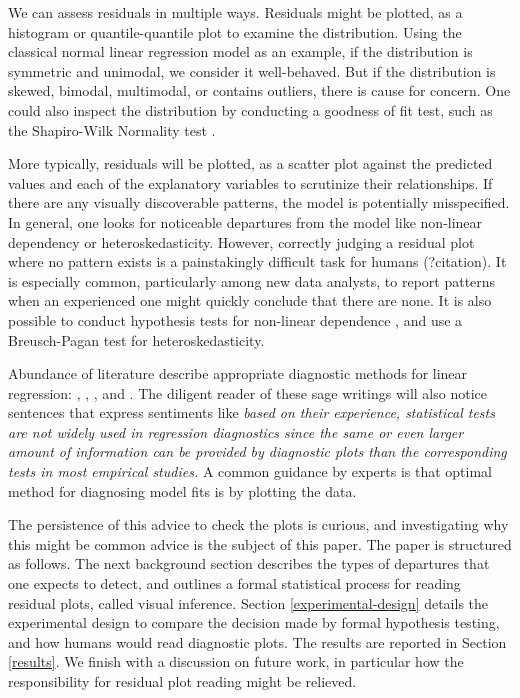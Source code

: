 \documentclass[]{interact}
\theoremstyle{plain}%
\theoremstyle{definition}
\theoremstyle{remark}
\begin{document}
We can assess residuals in multiple ways. Residuals might be plotted, as
a histogram or quantile-quantile plot to examine the distribution. Using
the classical normal linear regression model as an example, if the
distribution is symmetric and unimodal, we consider it well-behaved. But
if the distribution is skewed, bimodal, multimodal, or contains
outliers, there is cause for concern. One could also inspect the
distribution by conducting a goodness of fit test, such as the
Shapiro-Wilk Normality test \citep{shapiro1965analysis}.

More typically, residuals will be plotted, as a scatter plot against the
predicted values and each of the explanatory variables to scrutinize
their relationships. If there are any visually discoverable patterns,
the model is potentially misspecified. In general, one looks for
noticeable departures from the model like non-linear dependency or
heteroskedasticity. However, correctly judging a residual plot where no
pattern exists is a painstakingly difficult task for humans (?citation).
It is especially common, particularly among new data analysts, to report
patterns when an experienced one might quickly conclude that there are
none. It is also possible to conduct hypothesis tests for non-linear
dependence \citep{ramsey_tests_1969}, and use a Breusch-Pagan test
\citep{breusch_simple_1979} for heteroskedasticity.

Abundance of literature describe appropriate diagnostic methods for
linear regression: \citet{draper1998applied},
\citet{montgomery1982introduction}, \citet{belsley_regression_1980},
\citet{cook_applied_1999} and \citet{cook1982residuals}. The diligent
reader of these sage writings will also notice sentences that express
sentiments like \emph{based on their experience, statistical tests are
not widely used in regression diagnostics since the same or even larger
amount of information can be provided by diagnostic plots than the
corresponding tests in most empirical studies.} A common guidance by
experts is that optimal method for diagnosing model fits is by plotting
the data.

The persistence of this advice to check the plots is curious, and
investigating why this might be common advice is the subject of this
paper. The paper is structured as follows. The next background section
describes the types of departures that one expects to detect, and
outlines a formal statistical process for reading residual plots, called
visual inference. Section \ref{experimental-design} details the
experimental design to compare the decision made by formal hypothesis
testing, and how humans would read diagnostic plots. The results are
reported in Section \ref{results}. We finish with a discussion on future
work, in particular how the responsibility for residual plot reading
might be relieved.
\end{document}
